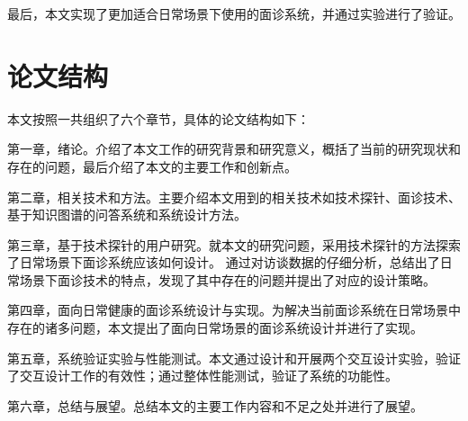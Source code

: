 最后，本文实现了更加适合日常场景下使用的面诊系统，并通过实验进行了验证。




\section{论文结构}
本文按照一共组织了六个章节，具体的论文结构如下：

第一章，绪论。介绍了本文工作的研究背景和研究意义，概括了当前的研究现状和存在的问题，最后介绍了本文的主要工作和创新点。

第二章，相关技术和方法。主要介绍本文用到的相关技术如技术探针、面诊技术、基于知识图谱的问答系统和系统设计方法。

第三章，基于技术探针的用户研究。就本文的研究问题，采用技术探针的方法探索了日常场景下面诊系统应该如何设计。
通过对访谈数据的仔细分析，总结出了日常场景下面诊技术的特点，发现了其中存在的问题并提出了对应的设计策略。

第四章，面向日常健康的面诊系统设计与实现。为解决当前面诊系统在日常场景中存在的诸多问题，本文提出了面向日常场景的面诊系统设计并进行了实现。

第五章，系统验证实验与性能测试。本文通过设计和开展两个交互设计实验，验证了交互设计工作的有效性；通过整体性能测试，验证了系统的功能性。

第六章，总结与展望。总结本文的主要工作内容和不足之处并进行了展望。
